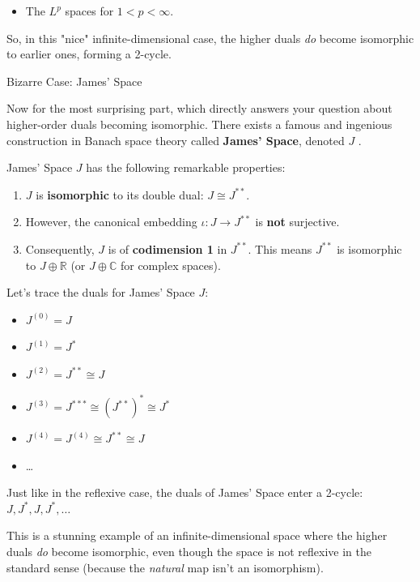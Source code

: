 \documentclass[aps,preprint]{revtex4}
\newenvironment{answer}
  {\begin{tcolorbox}[colback=green!5!white,colframe=green!75!black,title=Answer]}
  {\end{tcolorbox}}
\begin{document}
\begin{answer}
\begin{itemize}
\item The $L^p$ spaces for $1 < p < \infty$.
\end{itemize}

So, in this "nice" infinite-dimensional case, the higher duals \textit{do}
become isomorphic to earlier ones, forming a 2-cycle.

Bizarre Case: James' Space

Now for the most surprising part, which directly answers your question about
higher-order duals becoming isomorphic. There exists a famous and ingenious
construction in Banach space theory called \textbf{James' Space}, denoted $J$%
.

James' Space $J$ has the following remarkable properties:

\begin{enumerate}
\item $J$ is \textbf{isomorphic} to its double dual: $J \cong J^{**}$.

\item However, the canonical embedding $\iota: J \to J^{**}$ is \textbf{not}
surjective.

\item Consequently, $J$ is of \textbf{codimension 1} in $J^{**}$. This means 
$J^{**}$ is isomorphic to $J \oplus \mathbb{R}$ (or $J \oplus \mathbb{C}$
for complex spaces).
\end{enumerate}

Let's trace the duals for James' Space $J$:

\begin{itemize}
\item $J^{(0)} = J$

\item $J^{(1)} = J^*$

\item $J^{(2)} = J^{**} \cong J$

\item $J^{(3)} = J^{***} \cong (J^{**})^* \cong J^*$

\item $J^{(4)} = J^{(4)} \cong J^{**} \cong J$

\item \ldots
\end{itemize}

Just like in the reflexive case, the duals of James' Space enter a 2-cycle: $%
J, J^*, J, J^*, \dots$

This is a stunning example of an infinite-dimensional space where the higher
duals \textit{do} become isomorphic, even though the space is not reflexive
in the standard sense (because the \textit{natural} map isn't an
isomorphism).


\end{answer}
\end{document}
